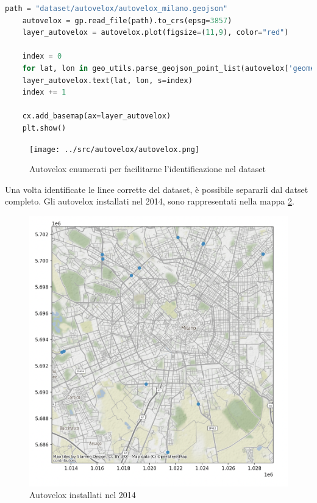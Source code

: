 \documentclass[a4paper]{report}
\begin{document}
\begin{lstlisting}[language=Python]
    path = "dataset/autovelox/autovelox_milano.geojson"
    autovelox = gp.read_file(path).to_crs(epsg=3857)
    layer_autovelox = autovelox.plot(figsize=(11,9), color="red")
    
    index = 0
    for lat, lon in geo_utils.parse_geojson_point_list(autovelox['geometry'].astype(str)):
    layer_autovelox.text(lat, lon, s=index)
    index += 1
    
    cx.add_basemap(ax=layer_autovelox)
    plt.show()
\end{lstlisting}

\begin{figure}
    \texttt{[image: ../src/autovelox/autovelox.png]}
    \caption{Autovelox enumerati per facilitarne l'identificazione nel dataset}
    \label{fig:autovelox-indici}
\end{figure}

Una volta identificate le linee corrette del dataset, è possibile separarli dal datset completo.
Gli autovelox installati nel 2014, sono rappresentati nella mappa \ref{fig:autovelox-2014}.
\begin{figure}
    \includegraphics[width=\linewidth]{../src/autovelox/autovelox_2014.png}
    \caption{Autovelox installati nel 2014}
    \label{fig:autovelox-2014}
\end{figure}
\end{document}

